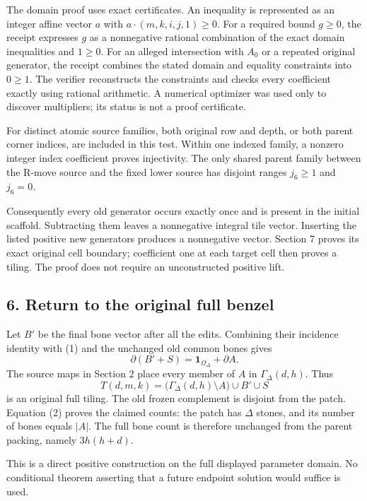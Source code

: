 \documentclass[
  10pt,
]{article}
\begin{document}
The domain proof uses exact certificates. An inequality is represented
as an integer affine vector \(a\) with \(a\cdot(m,k,i,j,1)\ge0\). For a
required bound \(g\ge0\), the receipt expresses \(g\) as a nonnegative
rational combination of the exact domain inequalities and \(1\ge0\). For
an alleged intersection with \(A_0\) or a repeated original generator,
the receipt combines the stated domain and equality constraints into
\(0\ge1\). The verifier reconstructs the constraints and checks every
coefficient exactly using rational arithmetic. A numerical optimizer was
used only to discover multipliers; its status is not a proof
certificate.

For distinct atomic source families, both original row and depth, or
both parent corner indices, are included in this test. Within one
indexed family, a nonzero integer index coefficient proves injectivity.
The only shared parent family between the R-move source and the fixed
lower source has disjoint ranges \(j_6\ge1\) and \(j_6=0\).

Consequently every old generator occurs exactly once and is present in
the initial scaffold. Subtracting them leaves a nonnegative integral
tile vector. Inserting the listed positive new generators produces a
nonnegative vector. Section 7 proves its exact original cell boundary;
coefficient one at each target cell then proves a tiling. The proof does
not require an unconstructed positive lift.

\subsection{6. Return to the original full
benzel}\label{return-to-the-original-full-benzel}

Let \(B'\) be the final bone vector after all the edits. Combining their
incidence identity with (1) and the unchanged old common bones gives \[
\partial(B'+S)=\mathbf1_{\Omega_\Delta}+\partial A.\tag{2}
\] The source maps in Section 2 place every member of \(A\) in
\(\Gamma_\Delta(d,h)\). Thus \[
T(d,m,k)=\bigl(\Gamma_\Delta(d,h)\setminus A\bigr)\cup B'\cup S
\] is an original full tiling. The old frozen complement is disjoint
from the patch. Equation (2) proves the claimed counts: the patch has
\(\Delta\) stones, and its number of bones equals \(|A|\). The full bone
count is therefore unchanged from the parent packing, namely
\(3h(h+d)\).

This is a direct positive construction on the full displayed parameter
domain. No conditional theorem asserting that a future endpoint solution
would suffice is used.
\end{document}
